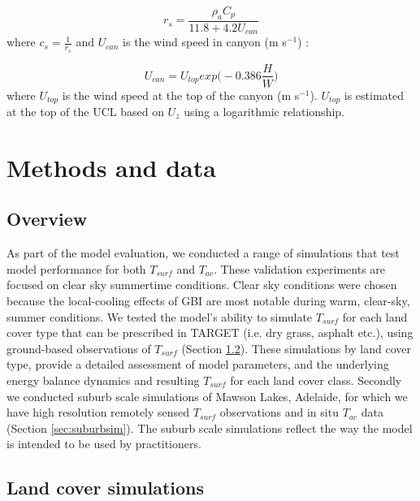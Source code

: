 \documentclass[gmd, manuscript]{copernicus}
\begin{document}
\begin{equation} 
\ensuremath{r_{s}} = 
\frac{\ensuremath{\rho_{a}}\ensuremath{C_{p}}}{11.8+4.2U_{can}}
\label{eq:rs} 
\end{equation} 
where $\ensuremath{c_{s}} = \frac{1}{\ensuremath{r_{s}}}$ and $U_{can}$ is the wind speed in canyon (m s$^{-1}$) \citep{Kusaka2001}: 

\begin{equation} 
U_{can} = \ensuremath{U_{top}} exp{ \Bigg( -0.386 \frac{H}{W} \Bigg)}
\label{eq:ucan} \end{equation} where \ensuremath{U_{top}} is the wind speed at the top of the canyon (m s$^{-1}$). \ensuremath{U_{top}} is estimated at the top of the UCL based on \ensuremath{U_{z}} using a logarithmic relationship.



\section{Methods and data}\label{sec:validation}
\subsection{Overview}\label{sec:validationover}


As part of the model evaluation, we conducted a range of simulations that test model performance for both $T_{surf}$ and $T_{ac}$. These validation experiments are focused on clear sky summertime conditions. Clear sky conditions were chosen because the local-cooling effects of GBI are most notable during warm, clear-sky, summer conditions. We tested the model's ability to simulate $T_{surf}$ for each land cover type that can be prescribed in TARGET (i.e. dry grass, asphalt etc.), using ground-based observations of $T_{surf}$ (Section \ref{sec:landcoversim}). These simulations by land cover type, provide a detailed assessment of model parameters, and the underlying energy balance dynamics and resulting $T_{surf}$ for each land cover class. Secondly we conducted suburb scale simulations of Mawson Lakes, Adelaide, for which we have high resolution remotely sensed $T_{surf}$ observations and in situ $T_{ac}$ data (Section \ref{sec:suburbsim}).  The suburb scale simulations reflect the way the model is intended to be used by practitioners.



\subsection{Land cover simulations}\label{sec:landcoversim} 
\end{document}
